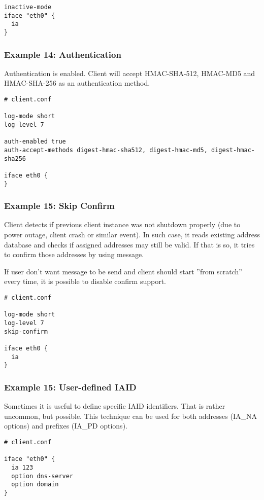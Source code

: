 \begin{lstlisting}
inactive-mode
iface "eth0" {
  ia
}
\end{lstlisting}

\subsubsection{Example 14: Authentication}
\label{example-client-auth}
Authentication is enabled. Client will accept HMAC-SHA-512, HMAC-MD5
and HMAC-SHA-256 as an authentication method.

\begin{lstlisting}
# client.conf

log-mode short
log-level 7

auth-enabled true
auth-accept-methods digest-hmac-sha512, digest-hmac-md5, digest-hmac-sha256

iface eth0 {
}
\end{lstlisting}

\subsubsection{Example 15: Skip Confirm}
\label{example-client-confirm}
Client detects if previous client instance was not shutdown properly
(due to power outage, client crash or similar event). In such case, it
reads existing address database and checks if assigned addresses may
still be valid. If that is so, it tries to confirm those addresses by
using  message.

If user don't want  message to be send and client should
start ''from scratch'' every time, it is possible to disable confirm
support.

\begin{lstlisting}
# client.conf

log-mode short
log-level 7
skip-confirm

iface eth0 {
  ia
}
\end{lstlisting}

\subsubsection{Example 15: User-defined IAID}
\label{example-client-iaid}
Sometimes it is useful to define specific IAID  identifiers. That is
rather uncommon, but possible. This technique can be used for both
addresses (IA\_NA options) and prefixes (IA\_PD options).

\begin{lstlisting}
# client.conf

iface "eth0" {
  ia 123
  option dns-server
  option domain
}
\end{lstlisting}

